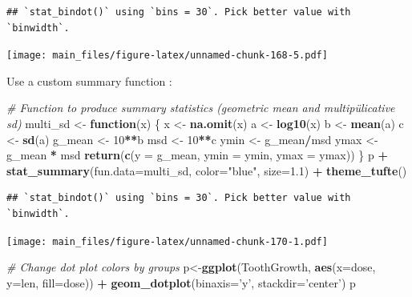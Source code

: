 \documentclass[]{book}
\newenvironment{Shaded}{\begin{snugshade}}{\end{snugshade}}
\newcommand{\KeywordTok}[1]{\textcolor[rgb]{0.13,0.29,0.53}{\textbf{#1}}}
\newcommand{\DataTypeTok}[1]{\textcolor[rgb]{0.13,0.29,0.53}{#1}}
\newcommand{\DecValTok}[1]{\textcolor[rgb]{0.00,0.00,0.81}{#1}}
\newcommand{\FloatTok}[1]{\textcolor[rgb]{0.00,0.00,0.81}{#1}}
\newcommand{\StringTok}[1]{\textcolor[rgb]{0.31,0.60,0.02}{#1}}
\newcommand{\CommentTok}[1]{\textcolor[rgb]{0.56,0.35,0.01}{\textit{#1}}}
\newcommand{\ControlFlowTok}[1]{\textcolor[rgb]{0.13,0.29,0.53}{\textbf{#1}}}
\newcommand{\OperatorTok}[1]{\textcolor[rgb]{0.81,0.36,0.00}{\textbf{#1}}}
\newcommand{\NormalTok}[1]{#1}
\begin{document}
\begin{verbatim}
## `stat_bindot()` using `bins = 30`. Pick better value with `binwidth`.
\end{verbatim}

\texttt{[image: main\_files/figure-latex/unnamed-chunk-168-5.pdf]}

Use a custom summary function :

\begin{Shaded}
\begin{Highlighting}[]
\CommentTok{# Function to produce summary statistics (geometric mean and multipülicative sd)}
\NormalTok{multi_sd <-}\StringTok{ }\ControlFlowTok{function}\NormalTok{(x) \{}
\NormalTok{  x <-}\StringTok{ }\KeywordTok{na.omit}\NormalTok{(x)}
\NormalTok{  a <-}\StringTok{ }\KeywordTok{log10}\NormalTok{(x)}
\NormalTok{  b <-}\StringTok{ }\KeywordTok{mean}\NormalTok{(a)}
\NormalTok{  c <-}\StringTok{ }\KeywordTok{sd}\NormalTok{(a)}
\NormalTok{  g_mean <-}\StringTok{ }\DecValTok{10}\OperatorTok{**}\NormalTok{b}
\NormalTok{  msd <-}\StringTok{ }\DecValTok{10}\OperatorTok{**}\NormalTok{c}
\NormalTok{  ymin <-}\StringTok{ }\NormalTok{g_mean}\OperatorTok{/}\NormalTok{msd}
\NormalTok{  ymax <-}\StringTok{ }\NormalTok{g_mean }\OperatorTok{*}\StringTok{ }\NormalTok{msd}
 \KeywordTok{return}\NormalTok{(}\KeywordTok{c}\NormalTok{(}\DataTypeTok{y =}\NormalTok{ g_mean, }\DataTypeTok{ymin =}\NormalTok{ ymin, }\DataTypeTok{ymax =}\NormalTok{ ymax)) }
\NormalTok{\}}
\NormalTok{p }\OperatorTok{+}\StringTok{ }\KeywordTok{stat_summary}\NormalTok{(}\DataTypeTok{fun.data=}\NormalTok{multi_sd, }\DataTypeTok{color=}\StringTok{"blue"}\NormalTok{, }\DataTypeTok{size=}\FloatTok{1.1}\NormalTok{) }\OperatorTok{+}\StringTok{ }\KeywordTok{theme_tufte}\NormalTok{()}
\end{Highlighting}
\end{Shaded}

\begin{verbatim}
## `stat_bindot()` using `bins = 30`. Pick better value with `binwidth`.
\end{verbatim}

\texttt{[image: main\_files/figure-latex/unnamed-chunk-170-1.pdf]}

\begin{Shaded}
\begin{Highlighting}[]
\CommentTok{# Change dot plot colors by groups}
\NormalTok{p<-}\KeywordTok{ggplot}\NormalTok{(ToothGrowth, }\KeywordTok{aes}\NormalTok{(}\DataTypeTok{x=}\NormalTok{dose, }\DataTypeTok{y=}\NormalTok{len, }\DataTypeTok{fill=}\NormalTok{dose)) }\OperatorTok{+}
\StringTok{  }\KeywordTok{geom_dotplot}\NormalTok{(}\DataTypeTok{binaxis=}\StringTok{'y'}\NormalTok{, }\DataTypeTok{stackdir=}\StringTok{'center'}\NormalTok{)}
\NormalTok{p}
\end{Highlighting}
\end{Shaded}
\end{document}
